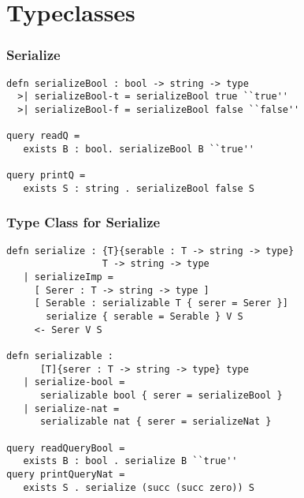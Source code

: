 \section{Typeclasses}
\begin{frame}[fragile]
\frametitle{Serialize}

\begin{lstlisting}
defn serializeBool : bool -> string -> type
  >| serializeBool-t = serializeBool true ``true''
  >| serializeBool-f = serializeBool false ``false''

query readQ = 
   exists B : bool. serializeBool B ``true''

query printQ = 
   exists S : string . serializeBool false S
\end{lstlisting}

\end{frame}

\begin{frame}[fragile]
\frametitle{Type Class for Serialize}

\begin{lstlisting}
defn serialize : {T}{serable : T -> string -> type} 
                 T -> string -> type
   | serializeImp = 
     [ Serer : T -> string -> type ]
     [ Serable : serializable T { serer = Serer }]
       serialize { serable = Serable } V S
     <- Serer V S

defn serializable : 
      [T]{serer : T -> string -> type} type
   | serialize-bool = 
      serializable bool { serer = serializeBool }
   | serialize-nat = 
      serializable nat { serer = serializeNat }

query readQueryBool = 
   exists B : bool . serialize B ``true''
query printQueryNat = 
   exists S . serialize (succ (succ zero)) S
\end{lstlisting}

\end{frame}
